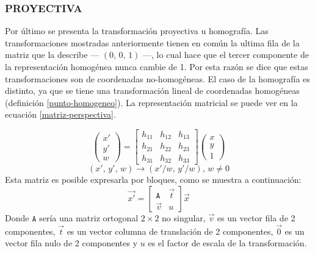 \subsubsection*{PROYECTIVA}

Por último se presenta la transformación proyectiva u homografía. Las transformaciones mostradas anteriormente  tienen en común la ultima fila de la matriz que la describe --- $(0,\, 0,\, 1)$ ---, lo cual hace que el tercer componente de la representación homogénea nunca cambie de 1. Por esta razón se dice que estas transformaciones son de coordenadas no-homogéneas. El caso de la homografía es distinto, ya que se tiene una transformación lineal de coordenadas homogéneas (definición \ref{punto-homogeneo}). La representación matricial se puede ver en la ecuación \ref{matriz-perspectiva}.

\begin{equation}
\begin{pmatrix}
{x'}\\{y'}\\{w}
\end{pmatrix} = 
\begin{bmatrix}
{h_{11}}&{h_{12}}&{h_{13}}\\
{h_{21}}&{h_{22}}&{h_{23}}\\
{h_{31}}&{h_{32}}&{h_{33}}
\end{bmatrix}
\begin{pmatrix}
{x}\\{y}\\{1}
\end{pmatrix}
\label{matriz-perspectiva}
\end{equation}
\begin{displaymath}
	(x', \,y', \,w) \to (x'/w,\, y'/w),\, w \neq 0
\end{displaymath}
Esta matriz es posible expresarla por bloques, como se muestra a continuación:
\begin{displaymath}
\vec{x'}= 
\begin{bmatrix}
{\mathtt{A}}&{\vec{t}}\\
{\vec{v}}&{u}
\end{bmatrix}
\vec{x}
\label{bloque-perspectiva}
\end{displaymath}
Donde $ \mathtt{A} $ sería una matriz ortogonal $2\times2$ no singular, $\vec{v}$ es un vector fila de 2 componentes, $\vec{t}$ es un vector columna de translación de 2 componentes, $\vec{0} $ es un vector fila nulo de 2 componentes y $u$ es el factor de escala de la transformación.


